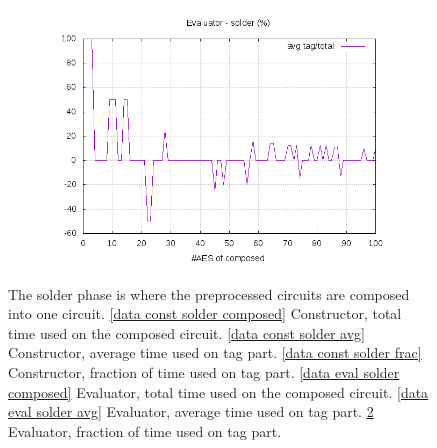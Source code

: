 \documentclass[10pt,a4paper]{article}
\begin{document}
\begin{figure}[h]
\begin{subfigure}[t]{0.3\textwidth}
        \includegraphics[width=\textwidth]{eval_solder_frac}
        \caption{}
        \label{data eval solder frac}
    \end{subfigure}
    \caption{The solder phase is where the preprocessed circuits are composed into one circuit. \ref{data const solder composed} Constructor, total time used on the composed circuit. \ref{data const solder avg} Constructor, average time used on tag part. \ref{data const solder frac} Constructor, fraction of time used on tag part. \ref{data eval solder composed} Evaluator, total time used on the composed circuit. \ref{data eval solder avg} Evaluator, average time used on tag part. \ref{data eval solder frac} Evaluator, fraction of time used on tag part.}
\end{figure}
\end{document}
